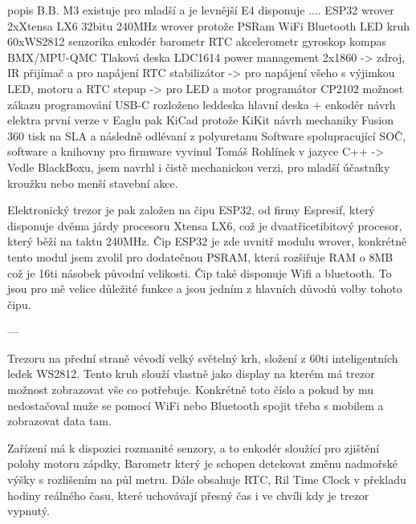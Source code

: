 popis B.B.
{
    M3
        existuje
        pro mladší a je levnější
    E4
        disponuje ....
            ESP32 wrover
                2xXtensa LX6
                    32bitu
                    240MHz
                wrover protože PSRam
                WiFi
                Bluetooth
            LED kruh
                60xWS2812
            senzorika
                enkodér  
                barometr
                RTC
                akcelerometr
                gyroskop
                kompas
                    BMX/MPU-QMC
                Tlaková deska
                    LDC1614                 %
            power management
                2x1860       -> zdroj, IR přijímač a pro napájení RTC
                stabilizátor -> pro napájení všeho s výjimkou LED, motoru a RTC
                stepup       -> pro LED a motor
            programátor
                CP2102 
                možnost zákazu programování
                USB-C
        rozloženo
            leddeska
            hlavní deska + enkodér
        návrh elektra
            první verze v Eaglu
            pak KiCad protože KiKit
        návrh mechaniky
            Fusion 360
            tisk na SLA a následně odlévaní z polyuretanu
        Software
            spolupracující SOČ, software a knihovny pro firmware vyvinul Tomáš Rohlínek 
                    v jazyce C++
}-> Vedle BlackBoxu, jsem navrhl i čistě mechanickou verzi, 
    pro mladší účastníky kroužku nebo menší stavební akce.
    
    Elektronický trezor je pak založen na čipu ESP32, od firmy Espresif, který disponuje 
    dvěma járdy procesoru Xtensa LX6, 
    což je dvaatřicetibitový procesor, který běží na taktu 240MHz. 
    Čip ESP32 je zde uvnitř modulu wrover, konkrétně tento modul jsem zvolil pro dodatečnou 
    PSRAM, která rozšiřuje RAM o 8MB
    což je 16ti násobek původní velikosti.
    Čip také disponuje Wifi a bluetooth. To jsou pro mě velice důležité funkce a jsou 
    jedním z hlavních důvodů volby tohoto čipu.

    ---

    Trezoru na přední straně vévodí velký světelný krh, složení z 60ti inteligentních ledek 
    WS2812. Tento kruh slouží vlastně jako display na kterém má trezor možnost zobrazovat 
    vše co potřebuje. Konkrétně toto číslo  a pokud by mu nedostačoval muže se pomocí WiFi nebo Bluetooth spojit 
    třeba s mobilem a zobrazovat data tam. 

    Zařízení má k dispozici rozmanité senzory, a to
        enkodér sloužící pro zjištění polohy motoru zápdky,
        Barometr který je schopen detekovat změnu nadmořské výšky
        s rozlišením na půl metru. %
        Dále obsahuje RTC, Ril Time Clock v překladu hodiny reálného času, 
        které uchovávají přesný čas i ve chvíli kdy je trezor vypnutý.
        
